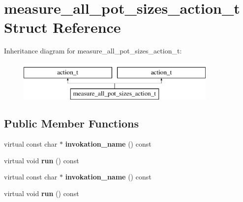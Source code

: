 \hypertarget{structmeasure__all__pot__sizes__action__t}{}\section{measure\+\_\+all\+\_\+pot\+\_\+sizes\+\_\+action\+\_\+t Struct Reference}
\label{structmeasure__all__pot__sizes__action__t}
Inheritance diagram for measure\+\_\+all\+\_\+pot\+\_\+sizes\+\_\+action\+\_\+t\+:\begin{figure}[H]
\begin{center}
\leavevmode
\includegraphics[height=2.000000cm]{structmeasure__all__pot__sizes__action__t}
\end{center}
\end{figure}
\subsection*{Public Member Functions}
\begin{DoxyCompactItemize}
\item 
\mbox{\label{structmeasure__all__pot__sizes__action__t_a34ad651f2b076d953017ce0f0f9e5422}} 
virtual const char $\ast$ {\bfseries invokation\+\_\+name} () const
\item 
\mbox{\label{structmeasure__all__pot__sizes__action__t_a0e609492bfec2fefd574cb35b60b1bfe}} 
virtual void {\bfseries run} () const
\item 
\mbox{\label{structmeasure__all__pot__sizes__action__t_a34ad651f2b076d953017ce0f0f9e5422}} 
virtual const char $\ast$ {\bfseries invokation\+\_\+name} () const
\item 
\mbox{\label{structmeasure__all__pot__sizes__action__t_a0e609492bfec2fefd574cb35b60b1bfe}} 
virtual void {\bfseries run} () const
\end{DoxyCompactItemize}


